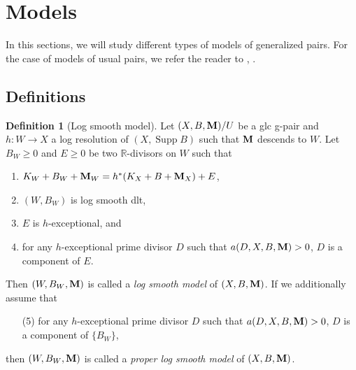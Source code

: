 \documentclass[11pt]{amsart}
\numberwithin{equation}{section}
\newcommand{\Mm}{{\bf{M}}}
\newcommand{\Rr}{\mathbb{R}}
\newcommand{\Supp}{\operatorname{Supp}}
\theoremstyle{definition}
\newtheorem{defn}[thm]{Definition}
\theoremstyle{definition}
\theoremstyle{definition}
\begin{document}
\begin{comment}
\end{proof}
\end{comment}




\section{Models}

In this sections, we will study  different types of models of generalized pairs. For the case of models of usual pairs, we refer the reader to \cite[Section 2]{Bir12a}, \cite[Section 2]{Has19}.

\subsection{Definitions}

\begin{defn}[Log smooth model]\label{defn: log smooth models}
Let $(X,B,\Mm)/U$ be a glc g-pair and $h: W\rightarrow X$ a log resolution of $(X,\Supp B)$ such that $\Mm$ descends to $W$. Let $B_W\geq 0$ and $E\geq 0$ be two $\Rr$-divisors on $W$ such that
\begin{enumerate}
    \item $K_W+B_W+\Mm_W=h^*(K_X+B+\Mm_X)+E$,
    \item $(W,B_W)$ is log smooth dlt,
    \item $E$ is $h$-exceptional, and
    \item for any $h$-exceptional prime divisor $D$ such that $a(D,X,B,\Mm)>0$, $D$ is a component of $E$.
\end{enumerate}
Then $(W,B_W,\Mm)$ is called a \emph{log smooth model} of $(X,B,\Mm)$. If we additionally assume that
\begin{itemize}
    \item[(5)] for any $h$-exceptional prime divisor $D$ such that $a(D,X,B,\Mm)>0$, $D$ is a component of $\{B_W\}$,
\end{itemize}
then $(W,B_W,\Mm)$ is called a \emph{proper log smooth model} of $(X,B,\Mm)$.
\end{defn}
\end{document}
